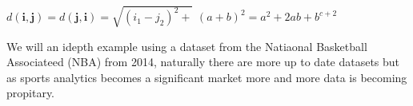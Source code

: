 ${d(\mathbf{i},\mathbf{j})} = {d(\mathbf{j},\mathbf{i})} =
\sqrt{{(i_1-j_2)^2} +} $
${(a+b)}^2 = a^2 + 2ab + b^{c+2}$

 

We will an idepth example using a dataset from the Natiaonal
Basketball Associateed (NBA) from 2014, naturally there are more up to
date datasets but as sports analytics becomes a significant market
more and more data is becoming propitary. 

\begin{comment}
\section{Draft: Deep Learning}

\section{Draft: Time Series}
\subsection{Overview of Time-Series Data}
This section will explore the make up of time-series (TS) data, and
the fundamental concepts needed to analyze TS date. More importantly
why simple linear regression models cannot be used. 
\subsection{Why is TS Data Important?}
This section will explore the application and relavence of TS data
with repspect to big-data. 
\subsection{Forecasting TS data}
This section will explore TS forecasting methods such as the ARIMA
model, ARCH/GARCH model, Vector Autoregression model, LSTM model and
NARX Networks...time permitting ELMAN and JORDAN netowrks. 
 
\end{comment}
